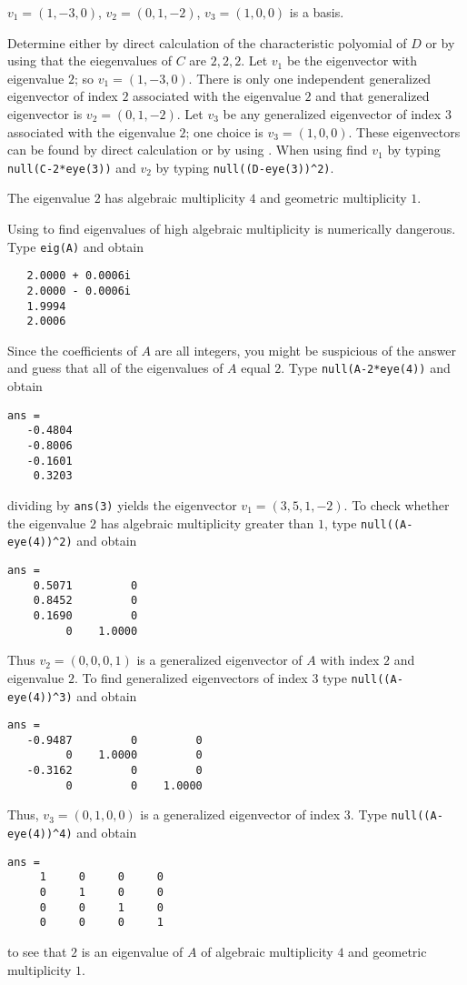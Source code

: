 \documentclass{ximera}
\begin{document}
 \ans $v_1=(1,-3,0)$, $v_2=(0,1,-2)$, $v_3=(1,0,0)$ is a basis.

\soln  Determine either by direct calculation of the characteristic polyomial of $D$ 
or by using \Matlab that the eiegenvalues of $C$ are $2,2,2$.  Let $v_1$ be the
eigenvector with eigenvalue $2$; so $v_1=(1,-3,0)$.  There is only one independent 
generalized eigenvector of index $2$ associated with the eigenvalue $2$ and that 
generalized eigenvector is $v_2=(0,1,-2)$.  Let $v_3$ be any generalized eigenvector 
of index $3$ associated with the eigenvalue $2$; one choice is $v_3=(1,0,0)$.  These 
eigenvectors can be found by direct calculation or by using \Matlab.  When using 
\Matlab find $v_1$ by typing {\tt null(C-2*eye(3))} and $v_2$ by typing 
{\tt null((D-eye(3))\^{}2)}.

 \ans The eigenvalue $2$ has algebraic multiplicity $4$ and geometric
multiplicity $1$.

\soln Using \Matlab to find eigenvalues of high algebraic multiplicity is numerically
dangerous. Type {\tt eig(A)} and obtain
\begin{verbatim}
   2.0000 + 0.0006i
   2.0000 - 0.0006i
   1.9994          
   2.0006          
\end{verbatim}
Since the coefficients of $A$ are all integers, you might be suspicious of the answer
and guess that all of the eigenvalues of $A$ equal $2$.  Type {\tt null(A-2*eye(4))}
and obtain
\begin{verbatim}
ans =
   -0.4804
   -0.8006
   -0.1601
    0.3203
\end{verbatim}
dividing by {\tt ans(3)} yields the eigenvector $v_1=(3,5,1,-2)$.  To check whether
the eigenvalue $2$ has algebraic multiplicity greater than $1$, type 
{\tt null((A-eye(4))\^{}2)} and obtain
\begin{verbatim}
ans =
    0.5071         0
    0.8452         0
    0.1690         0
         0    1.0000
\end{verbatim}
Thus $v_2=(0,0,0,1)$ is a generalized eigenvector of $A$ with index $2$ and eigenvalue
$2$.  To find generalized eigenvectors of index $3$ type {\tt null((A-eye(4))\^{}3)} 
and obtain
\begin{verbatim}
ans =
   -0.9487         0         0
         0    1.0000         0
   -0.3162         0         0
         0         0    1.0000
\end{verbatim}
Thus, $v_3=(0,1,0,0)$ is a generalized eigenvector of index $3$.  Type 
{\tt null((A-eye(4))\^{}4)} and obtain
\begin{verbatim}
ans =
     1     0     0     0
     0     1     0     0
     0     0     1     0
     0     0     0     1
\end{verbatim}
to see that $2$ is an eigenvalue of $A$ of algebraic multiplicity $4$ and geometric
multiplicity $1$.  
\end{document}
